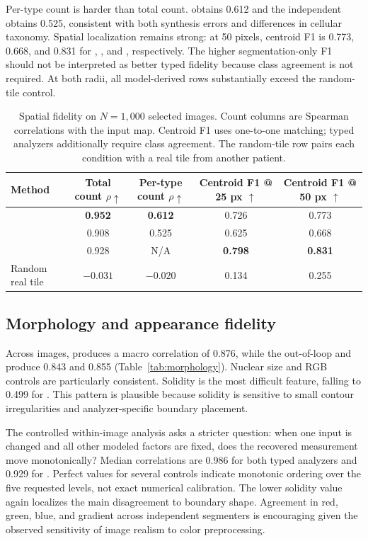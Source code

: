 Per-type count is harder than total count. \cellvit{} obtains 0.612 and the independent \hovernet{} obtains 0.525, consistent with both synthesis errors and differences in cellular taxonomy. Spatial localization remains strong: at 50 pixels, centroid F1 is 0.773, 0.668, and 0.831 for \cellvit{}, \hovernet{}, and \stardist{}, respectively. The higher segmentation-only \stardist{} F1 should not be interpreted as better typed fidelity because class agreement is not required. At both radii, all model-derived rows substantially exceed the random-tile control.

\begin{table}[t]
\centering
\caption{Spatial fidelity on $N=1{,}000$ selected images. Count columns are Spearman correlations with the input map. Centroid F1 uses one-to-one matching; typed analyzers additionally require class agreement. The random-tile row pairs each condition with a real tile from another patient.}
\label{tab:spatial}
\setlength{\tabcolsep}{7pt}
\begin{tabular}{lcccc}
\toprule
Method & Total count $\rho\uparrow$ & Per-type count $\rho\uparrow$ & Centroid F1 @ 25 px $\uparrow$ & Centroid F1 @ 50 px $\uparrow$ \\
\midrule
\cellvit{} & \textbf{0.952} & \textbf{0.612} & 0.726 & 0.773 \\
\hovernet{} & 0.908 & 0.525 & 0.625 & 0.668 \\
\stardist{} & 0.928 & N/A & \textbf{0.798} & \textbf{0.831} \\
Random real tile & $-0.031$ & $-0.020$ & 0.134 & 0.255 \\
\bottomrule
\end{tabular}
\end{table}



\subsection{Morphology and appearance fidelity}

Across images, \cellvit{} produces a macro correlation of 0.876, while the out-of-loop \hovernet{} and \stardist{} produce 0.843 and 0.855 (Table~\ref{tab:morphology}). Nuclear size and RGB controls are particularly consistent. Solidity is the most difficult feature, falling to 0.499 for \hovernet{}. This pattern is plausible because solidity is sensitive to small contour irregularities and analyzer-specific boundary placement.

The controlled within-image analysis asks a stricter question: when one input is changed and all other modeled factors are fixed, does the recovered measurement move monotonically? Median correlations are 0.986 for both typed analyzers and 0.929 for \stardist{}. Perfect values for several controls indicate monotonic ordering over the five requested levels, not exact numerical calibration. The lower \stardist{} solidity value again localizes the main disagreement to boundary shape. Agreement in red, green, blue, and gradient across independent segmenters is encouraging given the observed sensitivity of image realism to color preprocessing.

